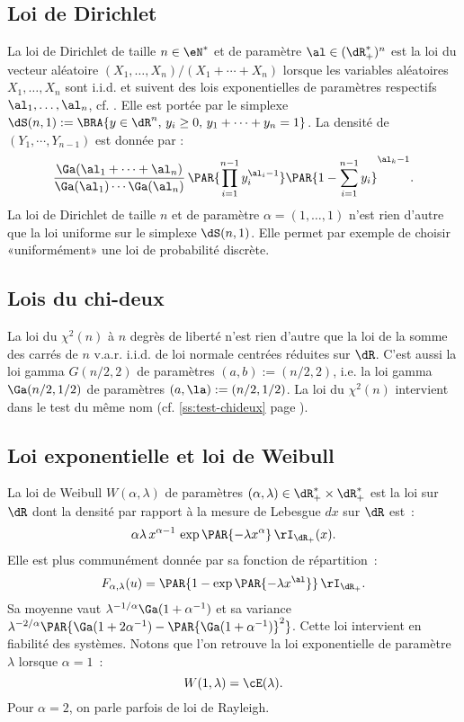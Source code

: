 %
\subsection{Loi de Dirichlet}\label{ss:loi:dirichlet}
%

La loi de Dirichlet de taille $n\in\eN^*$ et de paramètre $\al\in(\dR_+^*)^n$ est
la loi du vecteur aléatoire $(X_1,\ldots,X_n)/(X_1+\cdots+X_n)$ lorsque les variables
aléatoires $X_1,\ldots,X_n$ sont i.i.d. et suivent des lois exponentielles de
paramètres respectifs $\al_1,\ldots,\al_n$, cf. \cite[exercice 8.2.15, page
192]{dacunha-castelle-duflo}. Elle est portée par le simplexe
$\dS(n,1):=\BRA{y\in\dR^n,\,y_i\geq 0,\,y_1+\cdots+y_n=1}$. La densité de
$(Y_1,\cdots,Y_{n-1})$ est donnée par :
$$
\frac{\Ga(\al_1+\cdots+\al_n)}{\Ga(\al_1)\cdots\Ga(\al_n)}
\,\PAR{\prod_{i=1}^{n-1}y_i^{\al_i-1}}\PAR{1-\sum_{i=1}^{n-1}y_i}^{\al_k-1}.
$$
La loi de Dirichlet de taille $n$ et de paramètre $\alpha=(1,\ldots,1)$ n'est rien
d'autre que la loi uniforme sur le simplexe $\dS(n,1)$. Elle permet par
exemple de choisir «uniformément» une loi de probabilité discrète.

%
\subsection{Lois du chi-deux}\label{ss:loi:chideux}
%

La loi du $\chi^2(n)$ à $n$ degrès de liberté n'est rien d'autre que la loi de la
somme des carrés de $n$ v.a.r. i.i.d. de loi normale centrées réduites sur
$\dR$. C'est aussi la loi gamma $G(n/2,2)$ de paramètres $(a,b):=(n/2,2)$,
i.e. la loi gamma $\Ga(n/2,1/2)$ de paramètres $(a,\la):=(n/2,1/2)$. La loi du
$\chi^2(n)$ intervient dans le test du même nom (cf. \ref{ss:test-chideux} page
\pageref{ss:test-chideux}).

%
\subsection{Loi exponentielle et loi de Weibull}\label{ss:loi:weibull}
%

La loi de Weibull $W(\alpha,\lambda)$ de paramètres $(\alpha,\lambda)\in\dR_+^*\times\dR_+^*$ est la loi sur
$\dR$ dont la densité par rapport à la mesure de Lebesgue $dx$ sur $\dR$ est~:
$$
\alpha\lambda\,x^{\alpha-1}\,\exp\PAR{-\lambda x^\alpha}\,\rI_{\dR_+}(x).
$$
Elle est plus communément donnée par sa fonction de répartition~:
$$
F_{\alpha,\lambda}(u)=\PAR{1-\exp\PAR{-\lambda x^\al}}\,\rI_{\dR_+}.
$$
Sa moyenne vaut $\lambda^{-1/\alpha}\Ga(1+\alpha^{-1})$ et sa variance
$\lambda^{-2/\alpha}\PAR{\Ga(1+2\alpha^{-1})-\PAR{\Ga(1+\alpha^{-1})}^2}$. Cette loi
intervient en fiabilité des systèmes. Notons que l'on retrouve la loi
exponentielle de paramètre $\lambda$ lorsque $\alpha=1$~:
$$
W(1,\lambda)=\cE(\lambda).
$$
Pour $\alpha=2$, on parle parfois de loi de Rayleigh.

